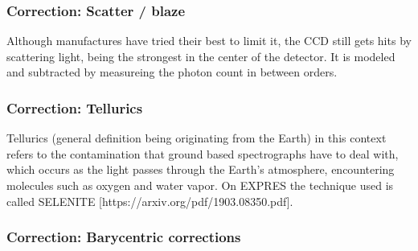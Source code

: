 \subsubsection{Correction: Scatter / blaze}
Although manufactures have tried their best to limit it, the CCD still gets hits by scattering light, being the strongest in the center of the detector. It is modeled and subtracted by measureing the photon count in between orders.

\subsubsection{Correction: Tellurics}
Tellurics (general definition being originating from the Earth) in this context refers to the contamination that ground based spectrographs have to deal with, which occurs as the light passes through the Earth's atmosphere, encountering molecules such as oxygen and water vapor. On EXPRES the technique used is called SELENITE [https://arxiv.org/pdf/1903.08350.pdf].

\subsubsection{Correction: Barycentric corrections}
\todo{}




